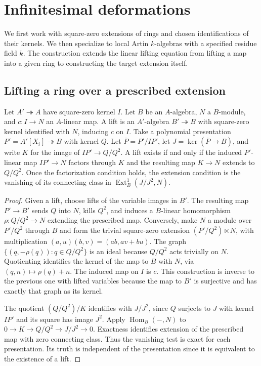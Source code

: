 \chapter{Infinitesimal deformations}
\label{ch:deformations}

We first work with square-zero extensions of rings and chosen
identifications of their kernels. We then specialize to local Artin
\(k\)-algebras with a specified residue field \(k\).
The construction extends the linear lifting equation
\cite[FL-06]{core} from lifting a map into a given ring to
constructing the target extension itself.

\section{Lifting a ring over a prescribed extension}

\begin{theorem}\label{res:T01}
Let \(A'\twoheadrightarrow A\) have square-zero kernel \(I\).
Let \(B\) be an \(A\)-algebra, \(N\) a \(B\)-module, and \(c:I\to N\)
an \(A\)-linear map. A lift is an \(A'\)-algebra \(B'\twoheadrightarrow B\)
with square-zero kernel identified with \(N\), inducing \(c\) on \(I\).
Take a polynomial presentation \(P'=A'[X_i]\twoheadrightarrow B\)
with kernel \(Q\). Let \(\overline P=P'/IP'\), let
\(J=\ker(\overline P\to B)\), and write \(K\) for the image of
\(IP'\to Q/Q^2\).
A lift exists if and only if the induced \(P'\)-linear map
\(IP'\to N\) factors through \(K\) and the resulting map
\(K\to N\) extends to \(Q/Q^2\). Once the factorization condition
holds, the extension condition is the vanishing of its connecting
class in \(\operatorname{Ext}^1_B(J/J^2,N)\).
\end{theorem}
\begin{proof}
Given a lift, choose lifts of the variable images in \(B'\).
The resulting map \(P'\to B'\) sends \(Q\) into \(N\), kills
\(Q^2\), and induces a \(B\)-linear homomorphism \(\rho:Q/Q^2\to N\)
extending the prescribed map. Conversely, make
\(N\) a module over \(P'/Q^2\) through \(B\) and form the trivial
square-zero extension \((P'/Q^2)\ltimes N\), with multiplication
\((a,u)(b,v)=(ab,av+bu)\).
The graph \(\{(q,-\rho(q)):q\in Q/Q^2\}\) is an ideal because
\(Q/Q^2\) acts trivially on \(N\). Quotienting identifies the kernel
of the map to \(B\) with \(N\), via \((q,n)\mapsto\rho(q)+n\).
The induced map on \(I\) is \(c\). This construction is inverse
to the previous one with lifted variables because the map to \(B'\)
is surjective and has exactly that graph as its kernel.

The quotient \((Q/Q^2)/K\) identifies with \(J/J^2\), since \(Q\)
surjects to \(J\) with kernel \(IP'\) and its square has image \(J^2\).
Apply \(\operatorname{Hom}_B(-,N)\) to
\(0\to K\to Q/Q^2\to J/J^2\to0\).
Exactness identifies extension of the prescribed map with zero
connecting class. Thus the vanishing test is exact for each
presentation. Its truth is independent of the presentation since
it is equivalent to the existence of a lift.
\end{proof}

